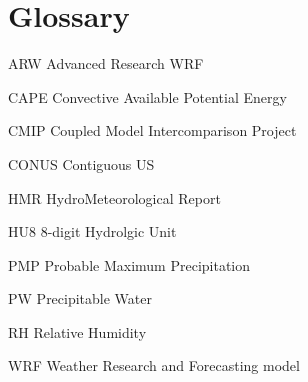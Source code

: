 \chapter*{Glossary}       %

\thispagestyle{plain}
%
\begin{glossary}

\item[ARW] Advanced Research WRF
\item[CAPE] Convective Available Potential Energy
\item[CMIP] Coupled Model Intercomparison Project
\item[CONUS] Contiguous US
\item[HMR] HydroMeteorological Report
\item[HU8] 8-digit Hydrolgic Unit
\item[PMP] Probable Maximum Precipitation
\item[PW] Precipitable Water
\item[RH] Relative Humidity
\item[WRF] Weather Research and Forecasting model

\end{glossary}